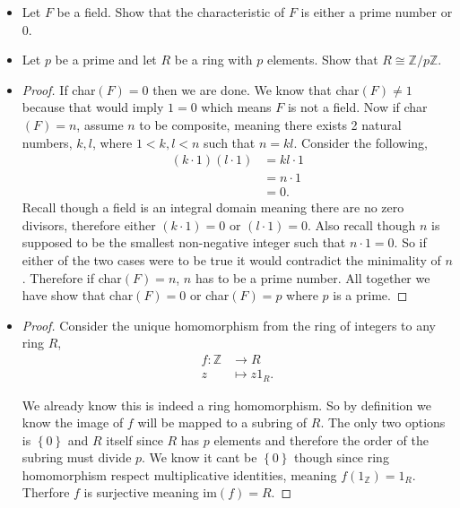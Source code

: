 \documentclass[11pt]{article}
\newenvironment{problem}[2][Problem\!]{\begin{trivlist}
\item[\hskip \labelsep {\bfseries #1}\hskip \labelsep {\bfseries #2}]}{\end{trivlist}}
\newcommand{\zz}{\mathbb Z}   %
\newcommand{\set}[1]{\left\{#1\right\}} %
\begin{document}
\begin{tcolorbox}
    \begin{problem} {10.3}
        \begin{itemize}
            \item[(a)] Let $F$ be a field. Show that the characteristic of $F$ is either a prime number or 0.
            \item[(b)] Let $p$ be a prime and let $R$ be a ring with $p$ elements. Show that $R \cong \zz/p\zz$. 
        \end{itemize}
    \end{problem}
\end{tcolorbox}
\begin{itemize}
    \item[(a)]
    \begin{proof}
        If char$(F) = 0$ then we are done. We know that char$(F) \neq 1$ because that would imply $1 = 0$ which means $F$ is not a field. Now if char$(F) = n$, assume $n$ to be composite, meaning there exists 2 natural numbers, $k,l$, where $1 < k, l < n$ such that $n = kl$. Consider the following,
        \begin{align*}
            (k \cdot 1)(l \cdot 1) &= kl \cdot 1 \\
            &= n \cdot 1 \\
            &= 0.
        \end{align*}
        Recall though a field is an integral domain meaning there are no zero divisors, therefore either $(k \cdot 1) = 0$ or $(l \cdot 1) = 0$. Also recall though $n$ is supposed to be the smallest non-negative integer such that $n \cdot 1 = 0$. So if either of the two cases were to be true it would contradict the minimality of $n$. Therefore if char$(F) = n$, $n$ has to be a prime number. All together we have show that char$(F) = 0$ or char$(F) = p$ where $p$ is a prime. 
    \end{proof} 
    \item[(b)]
    \begin{proof}
        Consider the unique homomorphism from the ring of integers to any ring $R$,
        \begin{align*}
            f: \zz &\to R \\
            z & \mapsto z1_R.
        \end{align*}

        We already know this is indeed a ring homomorphism. So by definition we know the image of $f$ will be mapped to a subring of $R$. The only two options is $\set{0}$ and $R$ itself since $R$ has $p$ elements and therefore the order of the subring must divide $p$. We know it cant be $\set{0}$ though since ring homomorphism respect multiplicative identities, meaning $f(1_\zz) = 1_R$. Therfore $f$ is surjective meaning im$(f) = R$. 


\end{proof}
\end{itemize}
\end{document}
